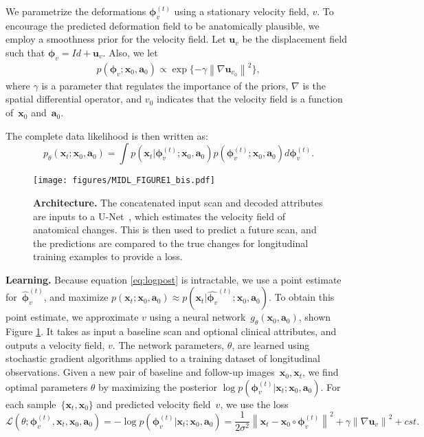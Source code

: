 \documentclass{midl} %
\newcommand{\bx}{\boldsymbol{x}}
\newcommand{\ba}{\boldsymbol{a}}
\newcommand{\bu}{\boldsymbol{u}}
\newcommand{\bphi}{\boldsymbol{\phi}}
\begin{document}
We parametrize the deformations $\bphi_v^{(t)}$ using a stationary velocity field, $v$. To encourage the predicted deformation field to be anatomically plausible, we employ a smoothness prior for the velocity field. Let $\bu_v$ be the displacement field such that $\bphi_v = Id + \bu_v$. Also, we let
%
\begin{align}
p(\bphi_v; \bx_0, \ba_0)  \propto \exp\{-\gamma \left\|\nabla \bu_{v_0} \right\|^2 \},
\end{align}
%
where $\gamma$ is a parameter that regulates the importance of the priors, $\nabla$ is the spatial differential operator, and $v_0$ indicates that the velocity field is a function of~$\bx_0$ and~$\ba_0$. 

The complete data likelihood is then written as:
\begin{equation}
p_\theta (\bx_t ;\bx_0, \ba_0) = \int p(\bx_t | \bphi_v^{(t)};\bx_0, \ba_0 ) p(\bphi_v^{(t)};\bx_0, \ba_0) d\bphi_v^{(t)}.
\label{eq:logpost}
\end{equation}


\begin{figure}
    \centering
    \vspace{-.5cm}
    \texttt{[image: figures/MIDL\_FIGURE1\_bis.pdf]}
    \caption{\vspace{-0.5cm}\textbf{Architecture.} The concatenated input scan and decoded attributes are inputs to a U-Net~\cite{ronneberger2015u}, which estimates the velocity field of anatomical changes. This is then used to predict a future scan, and the predictions are compared to the true changes for longitudinal training examples to provide a loss. \vspace{-1.1cm}}
    \label{fig:architecture_decoder_Unet}
\end{figure}


\noindent\textbf{Learning.} Because equation \eqref{eq:logpost} is intractable, we use a point estimate for~$\hat{\bphi}_v^{(t)}$, and maximize $p(\bx_t; \bx_0, \ba_0) \approx p(\bx_t | \hat{\bphi_v}^{(t)};\bx_0, \ba_0 )$. To obtain this point estimate, we approximate $v$ using a neural network~$g_{\theta} (\bx_0, \ba_0)$,  shown Figure \ref{fig:architecture_decoder_Unet}. It takes as input a baseline scan and optional clinical attributes, and outputs a velocity field, $v$. The network parameters, $\theta$, are learned using stochastic gradient algorithms applied to a training dataset of longitudinal observations. Given a new pair of baseline and follow-up images~$\bx_0, \bx_t$, we find optimal parameters $\theta$ by maximizing the posterior $\log p(\bphi_{v}^{(t)} |  \bx_{t};\bx_{0}, \ba_{0})$. For each sample~$\{\bx_t, \bx_0\}$ and predicted velocity field~$v$, we use the loss
%
\begin{equation*}
\mathcal{L}(\theta; \bphi_{v}^{(t)} , \bx_t,  \bx_0, \ba_0) =-  \log p(\bphi_{v}^{(t)} |  \bx_{t};\bx_{0}, \ba_{0})=  \frac{1}{2\sigma^2}\left\|\bx_t - \bx_0 \circ \bphi_{v}^{(t)} \right\|^2 + \gamma \left\|\nabla \bu_v \right\|^2 + cst.
\label{eq:loss}
\end{equation*}
\end{document}
